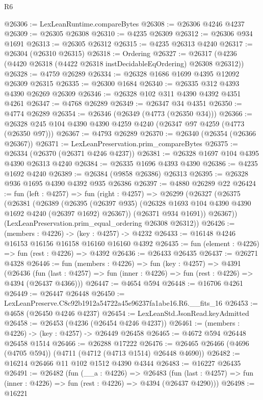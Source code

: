 \begin{lexlean}{R6}
\begin{coremodule}
@26306 := LexLeanRuntime.compareBytes
@26308 := @26306 @4246 @4237
@26309 := @26305 @26308
@26310 := @4235 @26309
@26312 := @26306 @934 @1691
@26313 := @26305 @26312
@26315 := @4235 @26313 @4240
@26317 := @26304 (@26310 @26315)
@26318 := Ordering
@26327 := @26317 (@4236 (@4420 @26318 (@4422 @26318 instDecidableEqOrdering) @26308 @26312))
@26328 := @4759 @26289
@26334 := @26328 @1686 @1699 @4395 @12092 @26309 @26315
@26335 := @26300 @1684
@26340 := @26335 @312 @4393 @4390 @26269 @26309
@26346 := @26328 @102 @311 @4390 @4392 @4351 @4261
@26347 := @4768 @26289
@26349 := @26347 @34 @4351
@26350 := @4774 @26289
@26354 := @26346 (@26349 (@4773 (@26350 @34)))
@26366 := @26328 @245 @104 @4390 @4390 @4259 @4240 (@26347 @97 @4259 (@4773 (@26350 @97)))
@26367 := @4793 @26289
@26370 := @26340 (@26354 (@26366 @26367))
@26371 := LexLeanPreservation.prim_compareBytes
@26375 := @26334 (@26370 (@26371 @4246 @4237))
@26381 := @26328 @1697 @104 @4395 @4390 @26313 @4240
@26384 := @26335 @1696 @4393 @4390
@26386 := @4235 @1692 @4240
@26389 := @26384 (@9858 @26386) @26313
@26395 := @26328 @936 @1695 @4390 @4392 @935 @26386
@26397 := @4880 @26289 @22
@26424 := fun (left : @4257) =>
  fun (right : @4257) =>
  @26299
    (@26327
      (@26375
        (@26381
          (@26389
            (@26395 (@26397 @935) (@26328 @1693 @104 @4390 @4390 @1692 @4240 (@26397 @1692) @26367))
            (@26371 @934 @1691))
          @26367))
      (LexLeanPreservation.prim_equal_ordering @26308 @26312))
@26426 := (members : @4226) -> (key : @4257) -> @4232
@26433 := @16148 @4246 @16153 @16156 @16158 @16160 @16160 @4392
@26435 := fun (element : @4226) => fun (rest : @4226) => @4392
@26436 := @26433 @26435
@26437 := @26271 @4328
@26446 := fun (members : @4226) =>
  fun (key : @4257) =>
  @4391
    (@26436
      (fun (last : @4257) => fun (inner : @4226) => fun (rest : @4226) => @4394 (@26437 @4366)))
@26447 := @4654 @594
@26448 := @16706 @4261
@26449 := @26447 @26448
@26450 := LexLeanPreserve.C8c92b1912a54722a45e96237fa1abe16.R6.__fits_16
@26453 := @4658 (@26450 @4246 @4237)
@26454 := LexLeanStd.JsonRead.keyAdmitted
@26458 := @26453 (@4236 (@26454 @4246 @4237))
@26461 := (members : @4226) -> (key : @4257) -> @26449 @26458
@26465 := @4672 @594 @26448 @26458 @1514
@26466 := @26288 @17222
@26476 := @26465 @26466 (@4696 (@4705 @594)) (@4711 (@4712 (@4713 @1514) @26448 @4690))
@26482 := @16214 @26466 @11 @102 @1512 @4390 @4344
@26483 := @16227 @26435
@26491 := @26482
    (fun (__a : @4226) =>
    @26483
      (fun (last : @4257) => fun (inner : @4226) => fun (rest : @4226) => @4394 (@26437 @4290)))
@26498 := @16221

\end{coremodule}
\end{lexlean}
